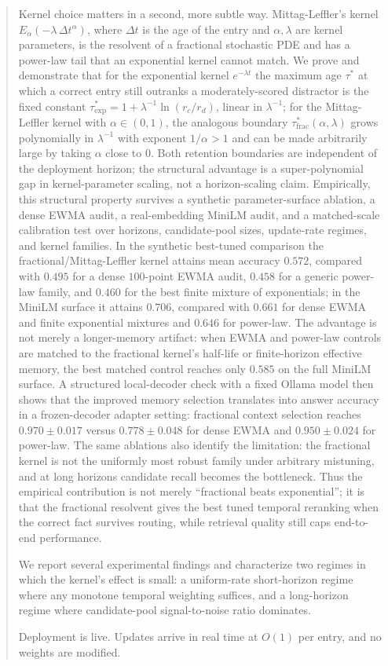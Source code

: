 \documentclass[11pt]{article}
\theoremstyle{plain}
\theoremstyle{definition}
\begin{document}
\begin{abstract}
Kernel choice matters in a second, more subtle way.
Mittag-Leffler's kernel
$E_\alpha(-\lambda\,\Delta t^\alpha)$, where
$\Delta t$ is the age of the entry and $\alpha, \lambda$
are kernel parameters, is the resolvent
of a fractional stochastic PDE and has a power-law tail
that an exponential kernel cannot match.  We prove and
demonstrate that for the exponential kernel
$e^{-\lambda t}$ the maximum age $\tau^*$ at which a
correct entry still outranks a moderately-scored
distractor is the fixed constant
$\tau^*_{\mathrm{exp}} = 1 + \lambda^{-1}\ln(r_c/r_d)$,
linear in $\lambda^{-1}$; for the Mittag-Leffler kernel
with $\alpha \in (0, 1)$, the analogous boundary
$\tau^*_{\mathrm{frac}}(\alpha, \lambda)$ grows
polynomially in $\lambda^{-1}$ with exponent $1/\alpha
> 1$ and can be made arbitrarily large by taking
$\alpha$ close to $0$.  Both retention boundaries are
independent of the deployment horizon; the structural
advantage is a super-polynomial gap in kernel-parameter
scaling, not a horizon-scaling claim.
Empirically, this structural property survives a
synthetic parameter-surface ablation, a dense EWMA audit,
a real-embedding MiniLM audit, and a matched-scale
calibration test over horizons, candidate-pool sizes,
update-rate regimes, and kernel families.  In the
synthetic best-tuned comparison the
fractional/Mittag-Leffler kernel attains mean accuracy
$0.572$, compared with $0.495$ for a dense $100$-point
EWMA audit, $0.458$ for a generic power-law family, and
$0.460$ for the best finite mixture of exponentials; in
the MiniLM surface it attains $0.706$, compared with
$0.661$ for dense EWMA and finite exponential mixtures
and $0.646$ for power-law.  The advantage is not merely
a longer-memory artifact: when EWMA and power-law
controls are matched to the fractional kernel's half-life
or finite-horizon effective memory, the best matched
control reaches only $0.585$ on the full MiniLM surface.
A structured local-decoder check with a fixed Ollama
model then shows that the improved memory selection
translates into answer accuracy in a frozen-decoder
adapter setting: fractional context selection reaches
$0.970\pm0.017$ versus $0.778\pm0.048$ for dense EWMA
and $0.950\pm0.024$ for power-law.  The same ablations
also identify the limitation: the fractional kernel is
not the uniformly most robust family under arbitrary
mistuning, and at long horizons candidate recall becomes
the bottleneck.  Thus the empirical contribution is not
merely ``fractional beats exponential''; it is that the
fractional resolvent gives the best tuned temporal
reranking when the correct fact survives routing, while
retrieval quality still caps end-to-end performance.

We report several experimental findings and characterize
two regimes in which the kernel's effect is small: a
uniform-rate short-horizon regime where any monotone
temporal weighting suffices, and a long-horizon regime
where candidate-pool signal-to-noise ratio dominates.

Deployment is live.  Updates arrive in real time at
$O(1)$ per entry, and no weights are modified.
\end{abstract}
\end{document}
